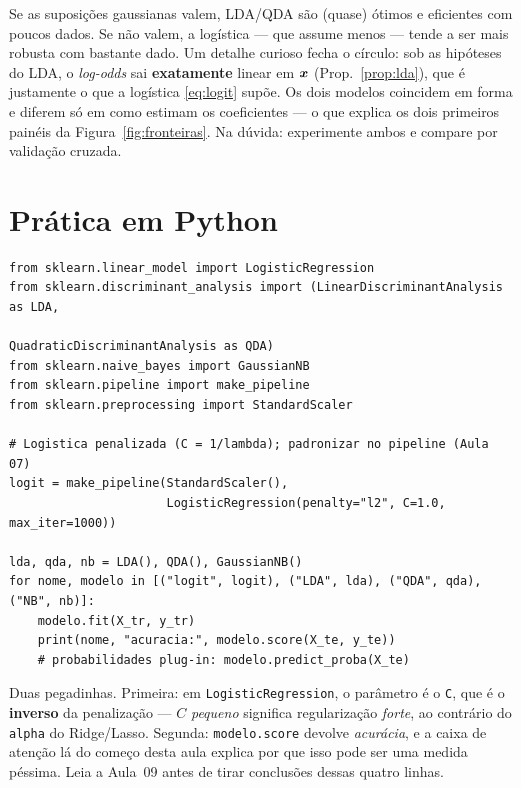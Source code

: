 \documentclass[11pt,a4paper]{article}
\begin{document}
\begin{ideia}
Se as suposições gaussianas valem, LDA/QDA são (quase) ótimos e eficientes com
poucos dados. Se não valem, a logística --- que assume menos --- tende a ser mais
robusta com bastante dado. Um detalhe curioso fecha o círculo: sob as hipóteses do
LDA, o \emph{log-odds} sai \textbf{exatamente} linear em $\bm{x}$
(Prop.~\ref{prop:lda}), que é justamente o que a logística \eqref{eq:logit} supõe.
Os dois modelos coincidem em forma e diferem só em como estimam os coeficientes ---
o que explica os dois primeiros painéis da Figura~\ref{fig:fronteiras}. Na dúvida:
experimente ambos e compare por validação cruzada.
\end{ideia}

\section{Prática em Python}
\begin{lstlisting}
from sklearn.linear_model import LogisticRegression
from sklearn.discriminant_analysis import (LinearDiscriminantAnalysis as LDA,
                                           QuadraticDiscriminantAnalysis as QDA)
from sklearn.naive_bayes import GaussianNB
from sklearn.pipeline import make_pipeline
from sklearn.preprocessing import StandardScaler

# Logistica penalizada (C = 1/lambda); padronizar no pipeline (Aula 07)
logit = make_pipeline(StandardScaler(),
                      LogisticRegression(penalty="l2", C=1.0, max_iter=1000))

lda, qda, nb = LDA(), QDA(), GaussianNB()
for nome, modelo in [("logit", logit), ("LDA", lda), ("QDA", qda), ("NB", nb)]:
    modelo.fit(X_tr, y_tr)
    print(nome, "acuracia:", modelo.score(X_te, y_te))
    # probabilidades plug-in: modelo.predict_proba(X_te)
\end{lstlisting}

\begin{atencao}
Duas pegadinhas. Primeira: em \texttt{LogisticRegression}, o parâmetro é o
\texttt{C}, que é o \textbf{inverso} da penalização --- $C$ \emph{pequeno} significa
regularização \emph{forte}, ao contrário do \texttt{alpha} do Ridge/Lasso.
Segunda: \texttt{modelo.score} devolve \emph{acurácia}, e a caixa de atenção lá do
começo desta aula explica por que isso pode ser uma medida péssima. Leia a
Aula~09 antes de tirar conclusões dessas quatro linhas.
\end{atencao}
\end{document}
